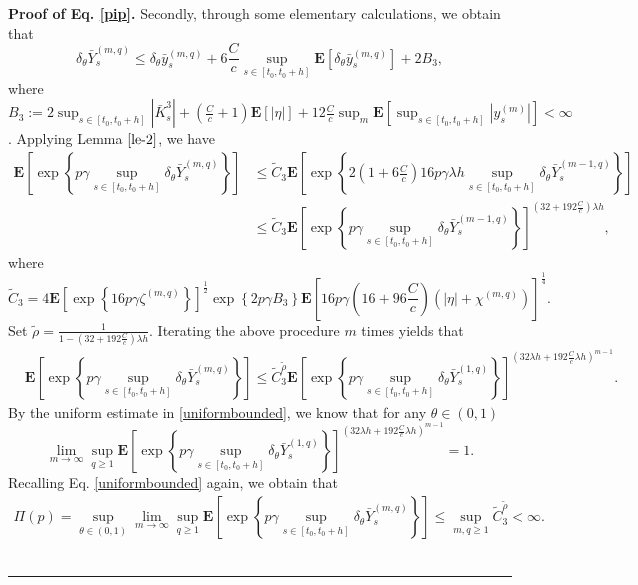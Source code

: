 \documentclass[10pt]{article}%
\numberwithin{equation}{section}
\newenvironment{proof}[1][Proof]{\noindent \textbf{#1.} }{\  \rule{0.5em}{0.5em}}
\begin{document}
\begin{proof}[Proof of Eq. \eqref{pip}]
Secondly, through some elementary calculations,  we obtain that $$\delta_{\theta}\bar{Y}_{s}^{(m,q)}\leq \delta_{\theta}\bar{y}_{s}^{(m,q)}+6\frac{C}{c}\sup_{s\in[t_0,t_0+h]}\mathbf{E}[\delta_{\theta}\bar{y}_{s}^{(m,q)}]+2B_3, $$
where $B_3:=2\sup_{s\in[t_0,t_0+h]}\left|\bar{K}^3_s\right|+\left(\frac{C}{c}+1\right)\mathbf{E}\left[\left|\eta\right|\right]+12\frac{C}{c}\sup_{m}\mathbf{E}[\sup_{s\in[t_0,t_0+h]}|y_s^{(m)}|]<\infty$. Applying Lemma $\ref{le-2}$, we have 
$$
\begin{aligned}
 \mathbf{E}\left[\exp\left\{p\gamma\sup_{s\in[t_0,t_0+h]}\delta_{\theta}\bar{Y}_{s}^{(m,q)}\right\}\right]&\leq\widetilde{C}_3 \mathbf{E}\left[\exp\left\{2(1+6\frac{C}{c})16p\gamma\lambda h\sup_{s\in[t_0,t_0+h]}\delta_\theta \bar{Y}_s^{(m-1, q)}\right\}\right]\\
 & \leq\widetilde{C}_3\mathbf{E}\left[\exp\left\{p\gamma\sup_{s\in[t_0,t_0+h]}\delta_\theta \bar{Y}_s^{(m-1, q)}\right\}\right]^{(32+192\frac{C}{c})\lambda h},
\end{aligned}
$$
where $$\widetilde{C}_3=4\mathbf{E}\left[\exp\left\{16p\gamma\zeta^{(m, q)} \right\}\right]^{\frac{1}{2}} \exp\left\{2p\gamma B_3\right\}\mathbf{E}\left[16p\gamma(16+96\frac{C}{c})\left(\left|\eta\right|+\chi^{(m,q)}\right)\right]^{\frac{1}{4}}.$$ 
Set $\widetilde{\rho}=\frac{1}{1-(32+192\frac{C}{c})\lambda h}$. Iterating the above procedure $m$ times yields that
$$
\begin{aligned}
 &\mathbf{E}\left[\exp\left\{p\gamma\sup_{s\in[t_0,t_0+h]}\delta_{\theta}\bar{Y}_{s}^{(m,q)}\right\}\right]
 \leq\widetilde{C}_3^{\widetilde{\rho}} \mathbf{E}\left[\exp\left\{p\gamma\sup_{s\in[t_0,t_0+h]}\delta_\theta \bar{Y}_s^{(1, q)}\right\}\right]^{(32\lambda h+192\frac{C}{c}\lambda h)^{m-1}}.
\end{aligned}
$$
By the uniform estimate in  \eqref{uniformbounded}, we know that for any $\theta\in(0,1)$
$$\lim_{m\to\infty}\sup_{q\geq 1}\mathbf{E}\left[\exp\left\{p\gamma\sup_{s\in[t_0,t_0+h]}\delta_\theta \bar{Y}_s^{(1, q)}\right\}\right]^{(32\lambda h+192\frac{C}{c}\lambda h)^{m-1}}=1.$$
Recalling Eq. \eqref{uniformbounded} again, we obtain that 
$$
\begin{aligned}
\Pi(p)=\sup_{\theta\in(0,1)}\lim_{m\to\infty}\sup_{q\geq 1}\mathbf{E}\left[\exp\left\{p\gamma\sup_{s\in[t_0,t_0+h]}\delta_{\theta}\bar{Y}_{s}^{(m,q)}\right\}\right]\leq \sup_{m,q\geq 1} \widetilde{C}_3^{\widetilde{\rho}} < \infty.
\end{aligned}$$ 
\end{proof}
\end{document}
